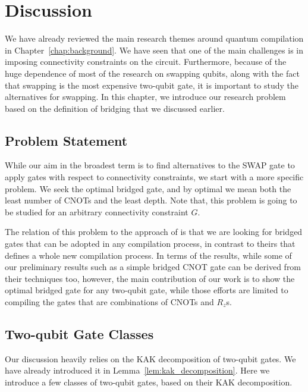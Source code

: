 \chapter{Discussion}\label{chap:discussion}

We have already reviewed the main research themes around quantum compilation in Chapter~\ref{chap:background}. We have seen that one of the main challenges is in imposing connectivity constraints on the circuit. Furthermore, because of the huge dependence of most of the research on swapping qubits, along with the fact that swapping is the most expensive two-qubit gate, it is important to study the alternatives for swapping. In this chapter, we introduce our research problem based on the definition of bridging that we discussed earlier.

\section{Problem Statement}

While our aim in the broadest term is to find alternatives to the SWAP gate to apply gates with respect to connectivity constraints, we start with a more specific problem. We seek the optimal bridged gate, and by optimal we mean both the least number of CNOTs and the least depth. Note that, this problem is going to be studied for an arbitrary connectivity constraint $G$.

The relation of this problem to the approach of \cite{nash2020,kissinger2019} is that we are looking for bridged gates that can be adopted in any compilation process, in contrast to theirs that defines a whole new compilation process. In terms of the results, while some of our preliminary results such as a simple bridged CNOT gate can be derived from their techniques too, however, the main contribution of our work is to show the optimal bridged gate for any two-qubit gate, while those efforts are limited to compiling the gates that are combinations of CNOTs and $R_z$s.

\section{Two-qubit Gate Classes}

Our discussion heavily relies on the KAK decomposition of two-qubit gates. We have already introduced it in Lemma~\ref{lem:kak_decomposition}. Here we introduce a few classes of two-qubit gates, based on their KAK decomposition.

